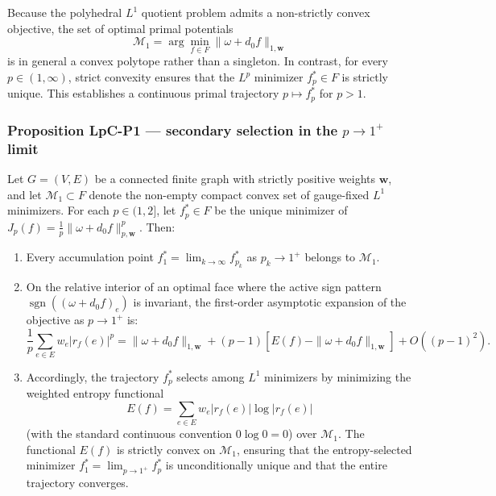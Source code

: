 \documentclass[
]{article}
\providecommand{\tightlist}{%
  \setlength{\itemsep}{0pt}\setlength{\parskip}{0pt}}
\providecommand{\tightlist}{%
  \setlength{\itemsep}{0pt}\setlength{\parskip}{0pt}}
\begin{document}
Because the polyhedral \(L^1\) quotient problem admits a non-strictly convex objective, the set of optimal primal potentials
\[\mathcal{M}_1 = \arg\min_{f \in F} \|\omega + d_0 f\|_{1, \mathbf{w}}\]
is in general a convex polytope rather than a singleton. In contrast, for every \(p \in (1, \infty)\), strict convexity ensures that the \(L^p\) minimizer \(f_p^* \in F\) is strictly unique. This establishes a continuous primal trajectory \(p \mapsto f_p^*\) for \(p > 1\).

\subsubsection{\texorpdfstring{Proposition LpC-P1 --- secondary selection in the \(p \to 1^+\) limit}{Proposition LpC-P1 --- secondary selection in the p \textbackslash to 1\^{}+ limit}}\label{proposition-lpc-p1-secondary-selection-in-the-p-to-1-limit}

Let \(G = (V,E)\) be a connected finite graph with strictly positive weights \(\mathbf{w}\), and let \(\mathcal{M}_1 \subset F\) denote the non-empty compact convex set of gauge-fixed \(L^1\) minimizers. For each \(p \in (1, 2]\), let \(f_p^* \in F\) be the unique minimizer of \(J_p(f) = \frac{1}{p} \|\omega + d_0 f\|_{p, \mathbf{w}}^p\). Then:

\begin{enumerate}
\def\labelenumi{\arabic{enumi}.}
\tightlist
\item
  Every accumulation point \(f_1^* = \lim_{k \to \infty} f_{p_k}^*\) as \(p_k \to 1^+\) belongs to \(\mathcal{M}_1\).
\item
  On the relative interior of an optimal face where the active sign pattern \(\operatorname{sgn}((\omega + d_0 f)_e)\) is invariant, the first-order asymptotic expansion of the objective as \(p \to 1^+\) is:
  \[\frac{1}{p} \sum_{e \in E} w_e |r_f(e)|^p = \|\omega + d_0 f\|_{1, \mathbf{w}} + (p - 1)\left[E(f)-\|\omega + d_0 f\|_{1, \mathbf{w}}\right] + O((p-1)^2).\]
\item
  Accordingly, the trajectory \(f_p^*\) selects among \(L^1\) minimizers by minimizing the weighted entropy functional
  \[E(f) = \sum_{e \in E} w_e |r_f(e)| \log |r_f(e)|\]
  (with the standard continuous convention \(0 \log 0 = 0\)) over \(\mathcal{M}_1\). The functional \(E(f)\) is strictly convex on \(\mathcal{M}_1\), ensuring that the entropy-selected minimizer \(f_1^* = \lim_{p \to 1^+} f_p^*\) is unconditionally unique and that the entire trajectory converges.
\end{enumerate}
\end{document}
